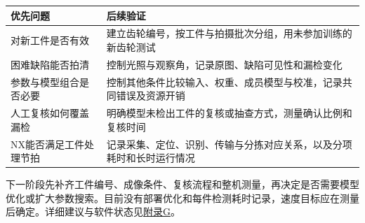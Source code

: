 \par\medskip\noindent\begin{minipage}{\linewidth}\small{}
\begin{tabular}{@{}>{\raggedright\arraybackslash}p{0.380\dimexpr\linewidth-2\tabcolsep\relax}>{\raggedright\arraybackslash}p{0.620\dimexpr\linewidth-2\tabcolsep\relax}@{}}
\toprule
优先问题 & 后续验证 \\
\midrule
对新工件是否有效 & 建立齿轮编号，按工件与拍摄批次分组，用未参加训练的新齿轮测试 \\
困难缺陷能否拍清 & 控制光照与观察角，记录原图、缺陷可见性和漏检变化 \\
参数与模型组合是否必要 & 控制其他条件比较输入、权重、成员模型与校准，记录共同错误及资源开销 \\
人工复核如何覆盖漏检 & 明确模型未检出工件的复核或抽查方式，测量确认比例和复核时间 \\
NX能否满足工件处理节拍 & 记录采集、定位、识别、传输与分拣对应关系，以及分项耗时和长时运行情况 \\
\bottomrule\end{tabular}\end{minipage}\par\medskip

下一阶段先补齐工件编号、成像条件、复核流程和整机测量，再决定是否需要模型优化或扩大参数搜索。目前没有部署优化和每件检测耗时记录，速度目标应在测量后确定。详细建议与软件状态见\protect\hyperlink{appendix-g}{附录G}。


